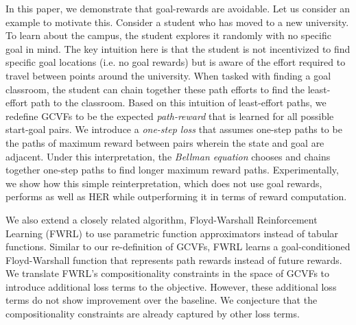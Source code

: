 %
In this paper, we demonstrate that goal-rewards are 
avoidable. Let us consider an example to motivate this. Consider a student who has moved
to a new university. To learn about the campus, the student explores it
randomly with no specific goal in mind. The key intuition here is that
the student is not incentivized to find specific goal locations (i.e.
no goal rewards) but is aware of the effort required to travel between
points around the university. When tasked with
finding a goal classroom, the student can chain together these
path efforts to find the least-effort path to the
classroom. 
%
Based on this intuition of least-effort paths, we redefine GCVFs to be
the expected \emph{path-reward} that is learned for all possible
start-goal pairs. We  
introduce a \emph{one-step loss} that assumes one-step paths 
to be the paths of maximum reward between pairs wherein the state and goal are adjacent.
Under this interpretation, the \emph{Bellman equation} chooses and chains
together one-step paths to find longer maximum reward paths. 
%
Experimentally, we show how this simple reinterpretation, which does not use goal
rewards, performs as well as HER while outperforming it in terms of
reward computation.

We also extend a closely related algorithm, Floyd-Warshall Reinforcement
Learning (FWRL) \citep{dhiman2018floydwarshall} to use parametric
function approximators instead of tabular functions. Similar to our
re-definition of GCVFs, FWRL learns a goal-conditioned Floyd-Warshall function
that represents path rewards instead of future rewards.
We translate FWRL's compositionality constraints in the space of GCVFs to introduce
additional loss terms to the objective. However, these additional loss
terms do not show improvement over the baseline. We conjecture that the
compositionality constraints are already captured by other loss terms. 

